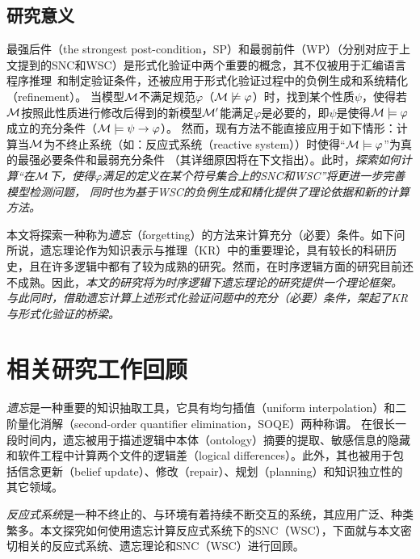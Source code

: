 

\subsection{研究意义}
最强后件（the strongest post-condition，SP）和最弱前件（WP）（分别对应于上文提到的SNC和WSC）是形式化验证中两个重要的概念，其不仅被用于汇编语言程序推理~\cite{legato2002weakest}和制定验证条件\cite{DBLP:journals/ipl/Leino05}，还被应用于形式化验证过程中的负例生成\cite{dailler2018instrumenting}和系统精化（refinement）\cite{woodcock1990refinement}。
当模型${\cal M}$不满足规范$\varphi$（${\cal M}\not \models \varphi$）时，找到某个性质$\psi$，使得若${\cal M}$按照此性质进行修改后得到的新模型${\cal M}'$能满足$\varphi$是必要的，即$\psi$是使得${\cal M}\models \varphi$成立的充分条件（${\cal M} \models \psi\rightarrow \varphi$）。
然而，现有方法不能直接应用于如下情形：计算当${\cal M}$为不终止系统（如：反应式系统（reactive system））时使得“${\cal M}\models \varphi$”为真的最强必要条件和最弱充分条件
（其详细原因将在下文指出）。此时，\emph{探索如何计算“在${\cal M}$下，使得$\varphi$满足的定义在某个符号集合上的SNC和WSC”将更进一步完善模型检测问题，
同时也为基于WSC的负例生成和精化提供了理论依据和新的计算方法。}

本文将探索一种称为\emph{遗忘}（forgetting）的方法来计算充分（必要）条件。如下问所说，遗忘理论作为知识表示与推理（KR）中的重要理论，具有较长的科研历史，且在许多逻辑中都有了较为成熟的研究。然而，在时序逻辑方面的研究目前还不成熟。因此，\emph{本文的研究将为时序逻辑下遗忘理论的研究提供一个理论框架。
与此同时，借助遗忘计算上述形式化验证问题中的充分（必要）条件，架起了KR与形式化验证的桥梁。}

\section{相关研究工作回顾}
\emph{遗忘}是一种重要的知识抽取工具，它具有均匀插值（uniform interpolation）和二阶量化消解（second-order quantifier elimination，SOQE）两种称谓。
在很长一段时间内，遗忘被用于描述逻辑中本体（ontology）摘要的提取、敏感信息的隐藏和软件工程中计算两个文件的逻辑差（logical differences）。此外，其也被用于包括信念更新（belief update）、修改（repair）、规划（planning）和知识独立性的其它领域。

{\em 反应式系统}是一种不终止的、与环境有着持续不断交互的系统，其应用广泛、种类繁多。本文探究如何使用遗忘计算反应式系统下的SNC（WSC），下面就与本文密切相关的反应式系统、遗忘理论和SNC（WSC）进行回顾。



